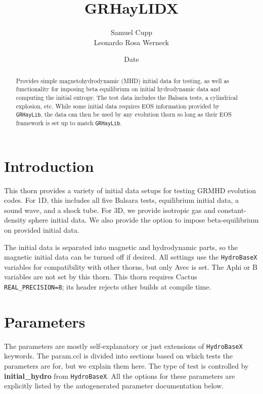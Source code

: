 \documentclass{article}
\begin{document}
\title{GRHayLIDX}
\author{Samuel Cupp \\ Leonardo Rosa Werneck}
\date{$ $Date$ $}

\maketitle


\newcommand{\glib}{\texttt{GRHayLib}}
\newcommand{\gid}{\texttt{GRHayLIDX}}
\newcommand{\hbase}{\texttt{HydroBaseX}}

\begin{abstract}
Provides simple magnetohydrodynamic (MHD) initial data for testing,
as well as functionality for imposing beta equilibrium on initial
hydrodynamic data and computing the initial entropy. The test data
includes the Balsara tests, a cylindrical explosion, etc. While
some initial data requires EOS information provided by \glib,
the data can then be used by any evolution thorn so long as their EOS
framework is set up to match \glib.
\end{abstract}

\section{Introduction}

This thorn provides a variety of initial data setups for
testing GRMHD evolution codes. For 1D, this includes all five
Balsara tests, equilibrium initial data, a sound wave, and
a shock tube. For 3D, we provide isotropic gas and
constant-density sphere initial data. We also provide the option
to impose beta-equilibrium on provided initial data.

The initial data is separated into magnetic and hydrodynamic
parts, so the magnetic initial data can be turned off if desired.
All settings use the \hbase{} variables for compatibility with
other thorns, but only Avec is set. The Aphi or B variables are
not set by this thorn.
This thorn requires Cactus \texttt{REAL\_PRECISION=8}; its header rejects
other builds at compile time.

\section{Parameters}

The parameters are mostly self-explanatory or just extensions of
\hbase{} keywords. The param.ccl is divided into sections based
on which tests the parameters are for, but we explain them here.
The type of test is controlled by \textbf{initial\_hydro} from
\hbase. All the options for these parameters are explicitly
listed by the autogenerated parameter documentation below.
\end{document}
